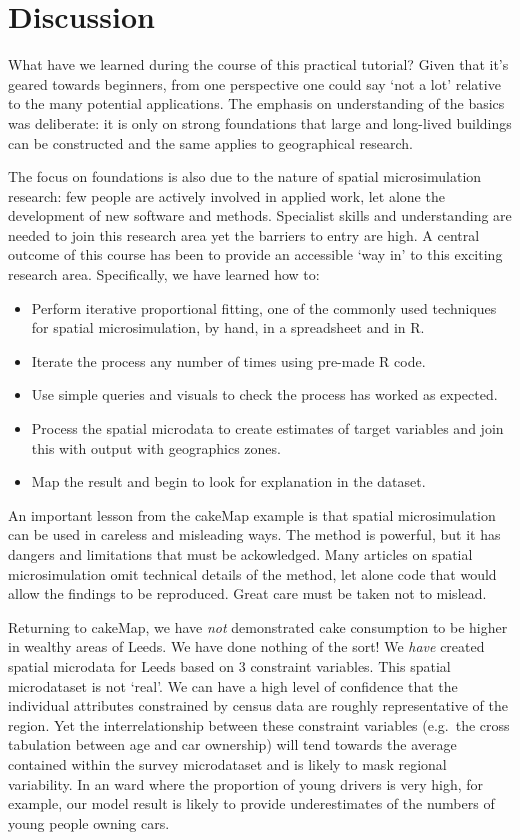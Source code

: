 \documentclass[a4paper, 11pt, twoside]{article}
\begin{document}
\section{Discussion}

What have we learned during the course of this practical tutorial?
Given that it's geared towards beginners, from one perspective
one could say `not a lot' relative to the many potential applications.
The emphasis on understanding of the basics was deliberate: it is only
on strong foundations that large and long-lived buildings can be 
constructed and the same applies to geographical research.

The focus on foundations is also due to the nature of spatial microsimulation
research: few people are actively involved in applied work, let alone the
development of new software and methods.
Specialist skills and understanding are needed to join this research area
yet the barriers to entry are high.
A central outcome of this course has been to provide an accessible `way in'
to this exciting research area. Specifically, we have learned how to:
\begin{itemize}
 \item Perform iterative proportional fitting, one of the commonly used
techniques for spatial microsimulation, by hand, in a spreadsheet and in R.
 \item Iterate the process any number of times using pre-made R code.
 \item Use simple queries and visuals to check the process has worked as expected.
 \item Process the spatial microdata to create estimates of target variables and
join this with output with geographics zones.
 \item Map the result and begin to look for explanation in the dataset.
\end{itemize}

An important lesson from the cakeMap example is
that spatial microsimulation can be used in careless and misleading ways.
The method is powerful, but it has dangers and limitations that must be ackowledged.
Many articles on spatial microsimulation omit technical details of the method,
let alone code that would allow the findings to be reproduced. Great
care must be taken not to mislead.

Returning to cakeMap, we have \emph{not}
demonstrated cake consumption to be higher in wealthy areas of Leeds.
We have done nothing of the sort! We \emph{have} created spatial microdata
for Leeds based on 3 constraint variables.
This spatial microdataset is not `real'. We can have a high level of confidence that the
individual attributes constrained by census data are roughly representative of the region.
Yet the interrelationship between these constraint variables
(e.g.~the cross tabulation between age and car ownership) will tend towards the average
contained within the survey microdataset and is likely to mask regional variability. In an ward
where the proportion of young drivers is very high, for example, our model result is likely
to provide underestimates of the numbers of young people owning cars.
\end{document}

